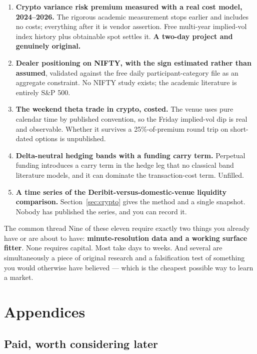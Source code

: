 \documentclass[11pt,a4paper]{article}
\begin{document}
\begin{enumerate}
\item \textbf{Crypto variance risk premium measured with a real cost model,
2024--2026.} The rigorous academic measurement stops earlier and includes no costs;
everything after it is vendor assertion. Free multi-year implied-vol index history
plus obtainable spot settles it. \textbf{A two-day project and genuinely original.}

\item \textbf{Dealer positioning on NIFTY, with the sign estimated rather than
assumed}, validated against the free daily participant-category file as an
aggregate constraint. No NIFTY study exists; the academic literature is entirely
S\&P 500.

\item \textbf{The weekend theta trade in crypto, costed.} The venue uses pure
calendar time by published convention, so the Friday implied-vol dip is real and
observable. Whether it survives a 25\%-of-premium round trip on short-dated options
is unpublished.

\item \textbf{Delta-neutral hedging bands with a funding carry term.} Perpetual
funding introduces a carry term in the hedge leg that no classical band literature
models, and it can dominate the transaction-cost term. Unfilled.

\item \textbf{A time series of the Deribit-versus-domestic-venue liquidity
comparison.} Section~\ref{sec:crypto} gives the method and a single snapshot.
Nobody has published the series, and you can record it.
\end{enumerate}

\begin{keyfact}{The common thread}
Nine of these eleven require exactly two things you already have or are about to
have: \textbf{minute-resolution data and a working surface fitter}. None requires
capital. Most take days to weeks. And several are simultaneously a piece of
original research and a falsification test of something you would otherwise have
believed --- which is the cheapest possible way to learn a market.
\end{keyfact}

\newpage
\section{Appendices}

\subsection{Paid, worth considering later}
\label{app:paid}
\end{document}
